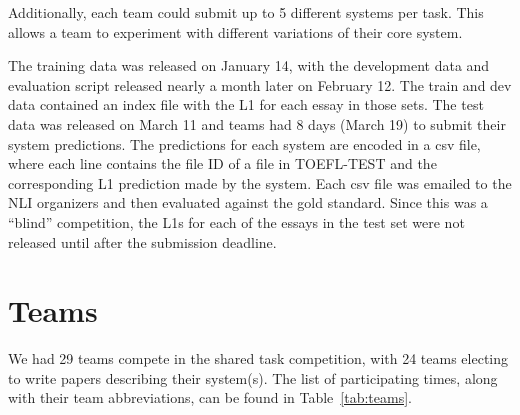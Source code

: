 \documentclass[11pt,letterpaper]{article}
\begin{document}
Additionally, each team could submit up to 5 different
systems per task.  This allows a team to experiment with different
variations of their core system.  

The training data was released on January 14, with the development
data and evaluation script released nearly a month later on February 12. 
The train and dev data contained an index file with the L1 for each
essay in those sets.  The test data was released on March 11 and teams had 
8 days (March 19) to submit their system predictions.  The predictions for 
each system
are encoded in a csv file, where each line contains the file ID of a 
file in TOEFL-TEST and the corresponding L1 prediction made by the 
system.  Each csv file was emailed to the NLI organizers and then
evaluated against the gold standard.  Since this was a ``blind''
competition, the L1s for each of the essays in the test set were not
released until after the submission deadline.  


\section{Teams}

We had 29 teams compete in the shared task competition, with 24 teams
electing to write papers describing their system(s).  The list
of participating times, along with their team abbreviations, can be 
found in Table~\ref{tab:teams}.
\end{document}
